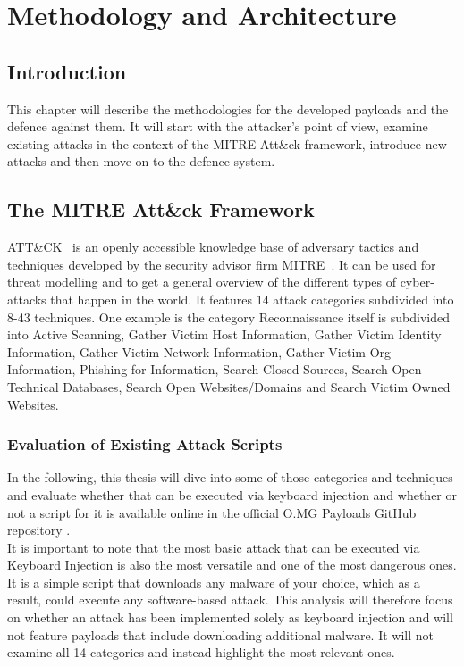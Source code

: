 \chapter{Methodology and Architecture} \label{Methodology}

\section{Introduction}

This chapter will describe the methodologies for the developed payloads and the defence against them. It will start with the attacker's point of view, examine existing attacks in the context of the MITRE Att\&ck framework, introduce new attacks and then move on to the defence system.


\section{The MITRE Att\&ck Framework}

ATT\&CK~\cite{MITREATTCK} is an openly accessible knowledge base of adversary tactics and techniques developed by the security advisor firm MITRE~\cite{WhoWeAre}. It can be used for threat modelling and to get a general overview of the different types of cyber-attacks that happen in the world.
It features 14 attack categories subdivided into 8-43 techniques. One example is the category Reconnaissance itself is subdivided into Active Scanning,
Gather Victim Host Information, Gather Victim Identity Information, Gather Victim Network Information, Gather Victim Org Information,
Phishing for Information, Search Closed Sources, Search Open Technical Databases, Search Open Websites/Domains and Search Victim Owned Websites.



\subsection{Evaluation of Existing Attack Scripts}

In the following, this thesis will dive into some of those categories and techniques and evaluate whether that can be executed via keyboard injection
and whether or not a script for it is available online in the official O.MG Payloads GitHub repository \cite{Hak5Omgpayloads2024}. \\
It is important to note that the most basic attack that can be executed via Keyboard Injection is also the most versatile and one of the most dangerous ones.
It is a simple script that downloads any malware of your choice, which as a result, could execute any software-based attack.
This analysis will therefore focus on whether an attack has been implemented solely as keyboard injection and will not feature payloads that include downloading additional malware.
It will not examine all 14 categories and instead highlight the most relevant ones.

